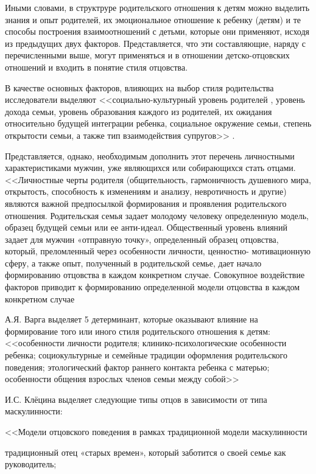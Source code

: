 \documentclass{../../common/thesisbyxetex}
\begin{document}
Иными словами, в структруре родительского отношения к детям можно выделить знания и опыт родителей,
их эмоциональное отношение к ребенку (детям) и те способы построения взаимоотношений с детьми,
которые они применяют, исходя из предыдущих двух факторов. Представляется, что эти составляющие,
наряду с перечисленными выше, могут применяться и в отношении детско-отцовских отношений и входить
в понятие стиля отцовства.

В качестве основных факторов, влияющих на выбор стиля родительства исследователи выделяют  
<<социально-культурный уровень
родителей , уровень дохода семьи, уровень
образования каждого из родителей, их ожидания относительно будущей интеграции
ребенка, социальное окружение семьи, степень открытости семьи, а также тип
взаимодействия супругов>> \cite[286]{strat}.

Представляется, однако, необходимым дополнить этот перечень личностными характеристиками мужчин, 
уже являющихся или собирающихся стать отцами. <<Личностные черты родителя
(общительность, гармоничность душевного мира, открытость, способность к
изменениям и анализу, невротичность и другие) являются важной предпосылкой
формирования и проявления родительского отношения. Родительская семья задает
молодому человеку определенную модель, образец будущей семьи или ее анти-идеал.
Общественный уровень влияний задает для мужчин «отправную точку», определенный
образец отцовства, который, преломленный через особенности личности, ценностно-
мотивационную сферу, а также опыт, полученный в родительской семье, дает начало
формированию отцовства в каждом конкретном случае. Совокупное воздействие
факторов приводит к формированию определенной модели отцовства в каждом
конкретном случае \cite[122]{har}


А.Я. Варга выделяет 5 детерминант, которые оказывают влияние на формирование того или иного стиля
родительского отношения к детям: <<особенности личности родителя; клинико-психологические
особенности ребенка; социокультурные и семейные традиции оформления родительского поведения;
этологический фактор раннего контакта ребенка с матерью; особенности общения взрослых членов семьи
между собой>> \cite[16]{varga}

И.С. Клёцина выделяет следующие типы отцов в зависимости от типа маскулинности:

<<Модели отцовского поведения в рамках традиционной модели маскулинности

традиционный отец «старых времен», который заботится о своей семье как руководитель;
\end{document}
